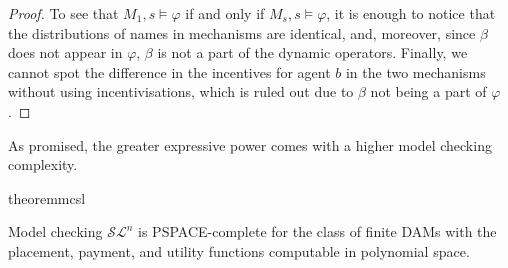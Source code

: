 \documentclass[letterpaper]{article} %
\theoremstyle{definition}
\newtheorem{theorem}{Theorem}
\newcommand{\munyque}[1]{{[\color{red}#1]}}
\begin{document}
\begin{proof}
To see that $M_1,s\models \varphi$ if and only if $M_s,s \models \varphi$, it is enough to notice that the distributions of names in mechanisms are identical, and, moreover, since $\beta$ does not appear in $\varphi$, $\beta$ is not a part of the dynamic operators. Finally, we cannot spot the difference in the incentives for agent $b$ in the two mechanisms without using incentivisations, which is ruled out due to $\beta$ not being a part of $\varphi$. 
 \end{proof} 
\fi

As promised, the greater expressive power comes with a higher model checking complexity.


\begin{restatable}{theorem}{mcsl}

    Model checking %
    $\mathcal{SL}^n$ is PSPACE-complete for the class of finite DAMs with the placement, payment, and utility functions computable in polynomial space. %
\end{restatable}
\end{document}
